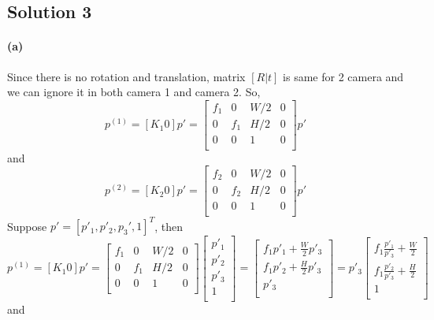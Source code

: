 \documentclass{article}
\newcommand{\solution}[1]{\clearpage \subsection*{Solution #1}}
\newcommand{\spart}[1]{\paragraph{(#1)}}
\begin{document}
\solution{3}
\spart{a}
Since there is no rotation and translation, matrix $[R|t]$ is same for 2 camera and we can ignore it in both camera 1 and camera 2.
So,
$$
  p^{(1)} = [K_1 0]p' = \begin{bmatrix}
    f_1 & 0 & W/2 & 0 \\
    0 & f_1 & H/2 & 0 \\
    0 & 0 & 1 & 0 \\
  \end{bmatrix}p'
$$
and 
$$
  p^{(2)} = [K_2 0]p' = \begin{bmatrix}
    f_2 & 0 & W/2 & 0\\
    0 & f_2 & H/2 & 0 \\
    0 & 0 & 1 & 0 \\
  \end{bmatrix}p'
$$
Suppose $p' = {[p'_1, p'_2, p_3', 1]}^T$, then
$$
  p^{(1)} = [K_1 0]p' = \begin{bmatrix}
    f_1 & 0 & W/2 & 0 \\
    0 & f_1 & H/2 & 0 \\
    0 & 0 & 1 & 0 \\
  \end{bmatrix}\begin{bmatrix}
    p'_1 \\
    p'_2 \\
    p'_3 \\
    1 \\
  \end{bmatrix} = \begin{bmatrix}
    f_1p'_1 + \frac{W}{2}p'_3 \\
    f_1p'_2 + \frac{H}{2}p'_3 \\
    p'_3 \\
  \end{bmatrix} = p'_3\begin{bmatrix}
    f_1\frac{p'_1}{p'_3} + \frac{W}{2} \\
    f_1\frac{p'_2}{p'_3} + \frac{H}{2} \\
    1 \\
  \end{bmatrix} 
$$
and
\end{document}
